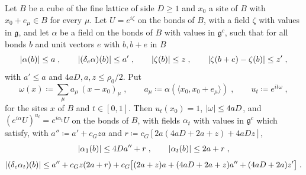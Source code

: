 \begin{lemma}\label{lem:gauge-reduction}
Let $B$ be a cube of the fine lattice of side $D \geq 1$ and $x_0$ a site of $B$ with $x_0 + e_\mu \in B$ for every $\mu$. Let $U = e^{i\zeta}$ on the bonds of $B$, with a field $\zeta$ with values in $\mathfrak g$, and let $\alpha$ be a field on the bonds of $B$ with values in $\mathfrak g^c$, such that for all bonds $b$ and unit vectors $e$ with $b, b + e$ in $B$
\begin{equation}\label{eq:reduction-hypotheses}
    \lvert\alpha(b)\rvert \leq a\;,
    \qquad
    \lvert(\delta_e\alpha)(b)\rvert \leq a'\;,
    \qquad
    \lvert\zeta(b)\rvert \leq z\;,
    \qquad
    \lvert\zeta(b + e) - \zeta(b)\rvert \leq z'\;,
\end{equation}
with $a' \leq a$ and $4aD, a, z \leq \rho_0/2$. Put
\begin{equation}\label{eq:gauge-function}
    \omega(x) \coloneqq \sum_\mu a_\mu\,(x - x_0)_\mu\;,
    \qquad
    a_\mu \coloneqq \alpha(\langle x_0, x_0 + e_\mu\rangle)\;,
    \qquad
    u_t \coloneqq e^{it\omega}\;,
\end{equation}
for the sites $x$ of $B$ and $t \in [0, 1]$. Then $u_t(x_0) = 1$, $\lvert\omega\rvert \leq 4aD$, and $(e^{i\alpha}U)^{u_t} = e^{i\alpha_t}U$ on the bonds of $B$, with fields $\alpha_t$ with values in $\mathfrak g^c$ which satisfy, with $a'' \coloneqq a' + c_Gza$ and $r \coloneqq c_G[2a(4aD + 2a + z) + 4aDz]$,
\begin{equation}\label{eq:reduced-phase}
    \lvert\alpha_1(b)\rvert \leq 4Da'' + r\;,
    \qquad
    \lvert\alpha_t(b)\rvert \leq 2a + r\;,
\end{equation}
\begin{equation}\label{eq:reduced-difference}
    \lvert(\delta_e\alpha_t)(b)\rvert \leq a'' + c_Gz(2a + r) + c_G\bigl[(2a + z)a + (4aD + 2a + z)a'' + (4aD + 2a)z'\bigr]\;.
\end{equation}
\end{lemma}

